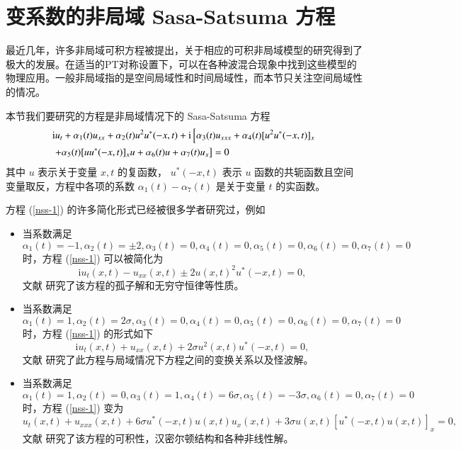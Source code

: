 \chapter{变系数的非局域  Sasa-Satsuma 方程}
最近几年，许多非局域可积方程被提出，关于相应的可积非局域模型的研究得到了极大的发展。在适当的PT对称设置下，可以在各种波混合现象中找到这些模型的物理应用。一般非局域指的是空间局域性和时间局域性，而本节只关注空间局域性的情况。

本节我们要研究的方程是非局域情况下的 Sasa-Satsuma 方程
\begin{align}
& \mathrm{i}u_{t} + \alpha_1(t) u_{xx} + \alpha_2(t)u^2u^*(-x,t) + \mathrm{i}\left[\alpha_3(t)u_{xxx} + \alpha_{4}(t)[u^{2}u^*(-x,t)]_{x}  \right. \notag\\
& \left. + \alpha_{5}(t)[uu^*(-x,t)]_{x}u + \alpha_{6}(t)u + \alpha_{7}(t)u_x\right] = 0 \label{nss-1}
\end{align}
其中 $u$ 表示关于变量 $x, t$ 的复函数， $u^*(-x,t)$ 表示 $u$ 函数的共轭函数且空间变量取反，方程中各项的系数 $\alpha_1(t) - \alpha_7(t)$ 是关于变量 $t$ 的实函数。

方程 (\ref{nss-1}) 的许多简化形式已经被很多学者研究过，例如
\begin{itemize}
  \item 当系数满足 $\alpha_1(t)=-1, \alpha_2(t)=\pm 2, \alpha_3(t)=0, \alpha_4(t)=0, \alpha_5(t)=0, \alpha_6(t) = 0, \alpha_7(t) = 0$ 时，方程 (\ref{nss-1}) 可以被简化为
      \begin{equation}
        \mathrm{i}u_t(x,t) - u_{xx}(x,t) \pm 2u(x,t)^2u^*(-x,t) = 0,
      \end{equation}
      文献 \cite{nss-1} 研究了该方程的孤子解和无穷守恒律等性质。
  \item 当系数满足 $\alpha_1(t)=1, \alpha_2(t)=2\sigma, \alpha_3(t)=0, \alpha_4(t)=0, \alpha_5(t)=0, \alpha_6(t) = 0, \alpha_7(t)= 0$ 时，方程 (\ref{nss-1}) 的形式如下
      \begin{equation}
         \mathrm{i}u_t(x,t) + u_{xx}(x,t) + 2\sigma u^2(x,t)u^*(-x,t) = 0,
      \end{equation}
      文献 \cite{nss-2} 研究了此方程与局域情况下方程之间的变换关系以及怪波解。
  \item 当系数满足 $\alpha_1(t)=1, \alpha_2(t)=0, \alpha_3(t)=1, \alpha_4(t)=6\sigma, \alpha_5(t)=-3\sigma, \alpha_6(t) = 0, \alpha_7(t) = 0$ 时，方程 (\ref{nss-1}) 变为
      \begin{equation}
        u_t(x,t) + u_{xxx}(x,t) + 6\sigma u^*(-x,t)u(x,t)u_x(x,t) + 3\sigma u(x,t)[u^*(-x,t)u(x,t)]_x = 0,
      \end{equation}
      文献 \cite{nss-3} 研究了该方程的可积性，汉密尔顿结构和各种非线性解。
\end{itemize}

